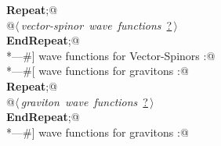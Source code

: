 \documentclass[a4paper,12pt]{amsart}
\renewcommand{\NWlink}[2]{\hyperlink{#1}{#2}}
\renewcommand{\NWsep}{${\diamond}$}
\begin{document}
\begin{flushleft}
\begin{list}{}{}
\mbox{}\verb@@\hbox{\sffamily\bfseries Repeat}\verb@;@\\
\mbox{}\verb@   @\hbox{$\langle\,${\it vector-spinor wave functions}\nobreak\ {\footnotesize \NWlink{nuweb?}{?}}$\,\rangle$}\verb@@\\
\mbox{}\verb@@\hbox{\sffamily\bfseries EndRepeat}\verb@;@\\
\mbox{}\verb@*---#] wave functions for Vector-Spinors :@\\
\mbox{}\verb@*---#[ wave functions for gravitons :@\\
\mbox{}\verb@@\hbox{\sffamily\bfseries Repeat}\verb@;@\\
\mbox{}\verb@   @\hbox{$\langle\,${\it graviton wave functions}\nobreak\ {\footnotesize \NWlink{nuweb?}{?}}$\,\rangle$}\verb@@\\
\mbox{}\verb@@\hbox{\sffamily\bfseries EndRepeat}\verb@;@\\
\mbox{}\verb@*---#] wave functions for gravitons :@\\
\mbox{}\verb@@{\NWsep}
\end{list}
\vspace{-1.5ex}
\footnotesize
\begin{list}{}{\setlength{\itemsep}{-\parsep}\setlength{\itemindent}{-\leftmargin}}

\item{}
\end{list}
\vspace{4ex}
\end{flushleft}
\end{document}
